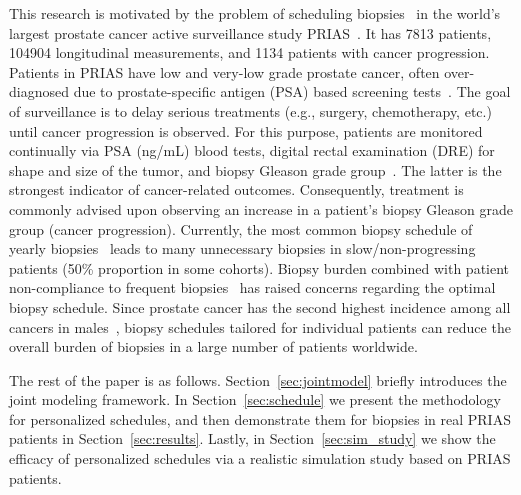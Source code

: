 This research is motivated by the problem of scheduling biopsies~\citep{nieboer2018active} in the world's largest prostate cancer active surveillance study PRIAS~\citep{bokhorst2015compliance}. It has 7813 patients, 104904 longitudinal measurements, and 1134 patients with cancer progression. Patients in PRIAS have low and very-low grade prostate cancer, often over-diagnosed due to prostate-specific antigen (PSA) based screening tests~\citep{crawford2003epidemiology}. The goal of surveillance is to delay serious treatments (e.g., surgery, chemotherapy, etc.) until cancer progression is observed. For this purpose, patients are monitored continually via PSA (ng/mL) blood tests, digital rectal examination (DRE) for shape and size of the tumor, and biopsy Gleason grade group~\citep{epsteinGG2014}. The latter is the strongest indicator of cancer-related outcomes. Consequently, treatment is commonly advised upon observing an increase in a patient's biopsy Gleason grade group (cancer progression). Currently, the most common biopsy schedule of yearly biopsies~\citep{loeb2014heterogeneity} leads to many unnecessary biopsies in slow/non-progressing patients (50\% proportion in some cohorts). Biopsy burden combined with patient non-compliance to frequent biopsies~\citep{bokhorst2015compliance} has raised concerns regarding the optimal biopsy schedule. Since prostate cancer has the second highest incidence among all cancers in males~\citep{GlobalCancerStats2012}, biopsy schedules tailored for individual patients can reduce the overall burden of biopsies in a large number of patients worldwide.

The rest of the paper is as follows. Section~\ref{sec:jointmodel} briefly introduces the joint modeling framework. In Section~\ref{sec:schedule} we present the methodology for personalized schedules, and then demonstrate them for biopsies in real PRIAS patients in Section~\ref{sec:results}. Lastly, in Section~\ref{sec:sim_study} we show the efficacy of personalized schedules via a realistic simulation study based on PRIAS patients.